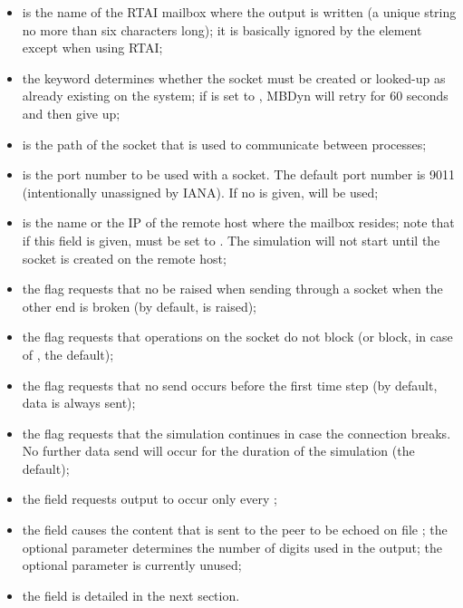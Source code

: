 \begin{itemize}
\item {} is the name of the RTAI mailbox where 
the output is written  (a unique string no more than six characters long);
it is basically ignored by the  element
except when using RTAI;

\item the  keyword determines whether the socket
must be created or looked-up as already existing on the system;
if  is set to , MBDyn will retry for 60 seconds
and then give up;

\item {} is the path of the  socket 
that is used to communicate between processes;

\item {} is the port number to be used with a  socket.
The default port number is 9011 (intentionally unassigned by IANA).
If no  is given,  will be used;

\item {} is the name or the IP of the remote host where
the mailbox resides; note that if this field is given,  must
be set to .
The simulation will not start until the socket is created on the remote host;

\item the flag  requests that no  be raised
when sending through a socket when the other end is broken
(by default,  is raised);

\item the flag  requests that operations on the socket
do not block (or block, in case of , the default);

\item the flag  requests that no send occurs before
the first time step (by default, data is always sent);

\item the flag  requests that the simulation
continues in case the connection breaks.
No further data send will occur for the duration of the simulation
(the default);

\item the field  requests output to occur
only every ;

\item the field  causes the content that is sent to the peer
to be echoed on file ; the optional parameter 
determines the number of digits used in the output; the optional parameter
 is currently unused;

\item the field  is detailed in the next section.
\end{itemize}
